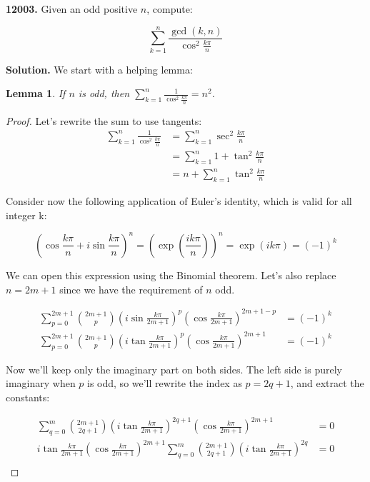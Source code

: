 \documentclass{letter}
\begin{document}
\newtheorem{lemma}{Lemma}

\begin{letter}{}


\textbf{12003.} Given an odd positive $n$, compute:
    
$$\sum_{k=1}^{n}\frac{\gcd(k, n)}{\cos^2\frac{k \pi}{n}}$$

  \textbf{Solution.} We start with a helping lemma:

  \begin{lemma}
    If $n$ is odd, then $\sum_{k=1}^{n}\frac{1}{\cos^2\frac{k \pi}{n}}=n^2$.
  \end{lemma}
  \begin{proof}
    Let's rewrite the sum to use tangents:
    \begin{align*}
      \sum_{k=1}^{n}\frac{1}{\cos^2\frac{k \pi}{n}}
      &=\sum_{k=1}^n \sec^2\frac{k \pi}{n} \\
      &=\sum_{k=1}^n 1+\tan^2\frac{k \pi}{n} \\
      &= n+\sum_{k=1}^n \tan^2\frac{k \pi}{n}
    \end{align*}

  Consider now the following application of Euler's identity, which is valid for all integer {k}:

    $$\left(\cos\frac{k\pi}{n}+i \sin\frac{k\pi}{n}\right)^n
    =\left(\exp\left(\frac{ik\pi}{n}\right)\right)^n=
    \exp\left(ik\pi\right)=(-1)^k$$

  We can open this expression using the Binomial theorem. Let's also replace $n=2m+1$ since we have the requirement of $n$ odd.

    \begin{align*}
      \sum_{p=0}^{2m+1}{2m+1\choose p}
      \left(i\sin\frac{k\pi}{2m+1}\right)^{p}
      \left(\cos\frac{k\pi}{2m+1}\right)^{2m+1-p} &= (-1)^k \\
    \sum_{p=0}^{2m+1}{2m+1\choose p}
      \left(i\tan\frac{k\pi}{2m+1}\right)^{p}
      \left(\cos\frac{k\pi}{2m+1}\right)^{2m+1} &= (-1)^k
    \end{align*}

  Now we'll keep only the imaginary part on both sides. The left side is purely imaginary when $p$ is odd, so we'll rewrite the index as $p=2q+1$, and extract the constants:

  \begin{align*}
    \sum_{q=0}^{m}{2m+1\choose 2q+1}
      \left(i\tan\frac{k\pi}{2m+1}\right)^{2q+1}
      \left(\cos\frac{k\pi}{2m+1}\right)^{2m+1} &= 0 \\
    i\tan\frac{k\pi}{2m+1}
    \left(\cos\frac{k\pi}{2m+1}\right)^{2m+1}
    \sum_{q=0}^{m}{2m+1\choose 2q+1}
      \left(i\tan\frac{k\pi}{2m+1}\right)^{2q}
       &= 0 \\
  \end{align*}


\end{proof}
\end{letter}
\end{document}
